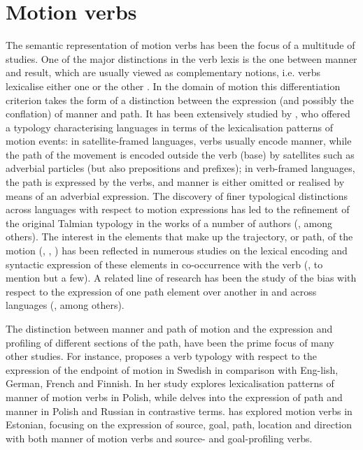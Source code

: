 \documentclass[output=paper,colorlinks,citecolor=brown]{langscibook}
\begin{document}
\section{Motion verbs}\label{motion-verbs}

The semantic representation of motion verbs has been the focus of a multitude of studies. One of the major distinctions in the verb lexis is the one between manner and result, which are usually viewed as complementary notions, i.e. verbs lexicalise either one or the other \citep{Levin2015}. In the domain of motion this differentiation criterion takes the form of a distinction between the expression (and possibly the conflation) of manner and path. It has been extensively studied by \citet{Talmy1985,Talmy1991,Talmy2000}, who offered a typology %
characterising languages in terms of the lexicalisation patterns of motion events: in satellite-framed languages, verbs usually encode manner, while the path of the movement is encoded outside the verb (base) by satellites such as adverbial particles (but also prepositions and prefixes); in verb-framed languages, the path is expressed by the verbs, and manner is either omitted or realised by means of an adverbial expression. The discovery of finer typological distinctions across languages with respect to motion expressions has led to the refinement of the original Talmian typology in the works of a number of authors (\cite{Aske1989,Slobin1996b,Papafragou2002,Ibarretxe-Antunano2004,Slobin2004,Filipovic2007,Beavers2010,Croft2010}, among others). The interest in the elements that make up the trajectory, or path, of the motion (\cite[162]{Jackendoff1983}, \cite[57]{Talmy1985}, \cite[275]{Lakoff1987}) has been reflected in numerous studies on the lexical encoding and syntactic expression of these elements in co-occurrence with the verb %
(\cite{Rohde2001,Rakhilina2004,StefanowitschRohde2004,Cristobal2010,Kopecka2010}, to mention but a few). A related line of research has been the study of the bias with respect to the expression of one path element over another in and across languages (\cite{Ikegami1987,DirvenVerspoor1998,StefanowitschRohde2004,WalchliZuniga2006,Verkerk2017}, among others).

The distinction between manner and path of motion and the expression and profiling of different sections of the path, have been the prime focus of many other studies. For instance, \citet{Viberg2015} proposes a verb typology with respect to the expression of the endpoint of motion in Swedish in comparison with Eng-\newline lish, German, French and Finnish. In her study \citet{Kopecka2010} explores lexicalisation patterns of manner of motion verbs in Polish, while \citet{Lozinska2018} delves into the expression of path and manner in Polish and Russian in contrastive terms. \citet{Taremaa2017,Taremaa2021} has explored motion verbs in Estonian, focusing on the expression of source, goal, path, location and direction with both manner of motion verbs and source- and goal-profiling verbs. 
\end{document}
